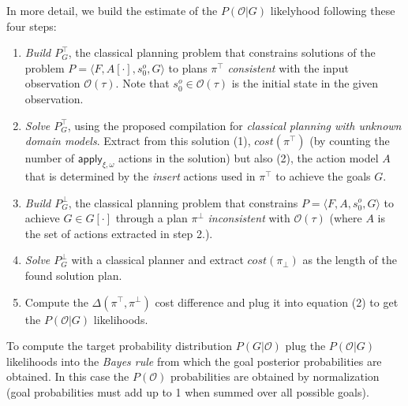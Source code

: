 \documentclass{article}
\newcommand{\tup}[1]{{\langle #1 \rangle}}
\begin{document}
In more detail, we build the estimate of the $P(\mathcal{O}|G)$ likelyhood following these four steps:
\begin{enumerate}
\item {\em Build $P^{\top}_G$}, the classical planning problem that constrains solutions of the problem $P=\tup{F,A[\cdot],s_0^o,G}$ to plans $\pi^\top$ {\em consistent} with the input observation $\mathcal{O}(\tau)$. Note that $s_0^o\in \mathcal{O}(\tau)$ is the initial state in the given observation.
\item {\em Solve $P^{\top}_G$}, using the proposed compilation for {\em classical planning with unknown domain models}. Extract from this solution (1), $cost(\pi^\top)$ (by counting the number of $\mathsf{apply_{\xi,\omega}}$ actions in the solution) but also (2), the action model $A$ that is determined by the {\em insert} actions used in $\pi^\top$ to achieve the goals $G$.
\item {\em Build $P^{\bot}_G$}, the classical planning problem that constrains $P=\tup{F,A,s_0^o,G}$ to achieve $G\in G[\cdot]$ through a plan $\pi^\bot$ {\em inconsistent} with $\mathcal{O}(\tau)$ (where $A$ is the set of actions extracted in step 2.).
\item {\em Solve $P^{\bot}_G$} with a classical planner and extract $cost(\pi_\bot)$ as the length of the found solution plan.
\item Compute the $\Delta(\pi^\top,\pi^\bot)$ cost difference and plug it into equation (2) to get the $P(\mathcal{O}|G)$ likelihoods.
\end{enumerate}

To compute the target probability distribution $P(G|\mathcal{O})$ plug the $P(\mathcal{O}|G)$ likelihoods into the {\em Bayes rule} from which the goal posterior probabilities are obtained. In this case the $P(\mathcal{O})$ probabilities are obtained by normalization (goal probabilities must add up to 1 when summed over all possible goals).
\end{document}
